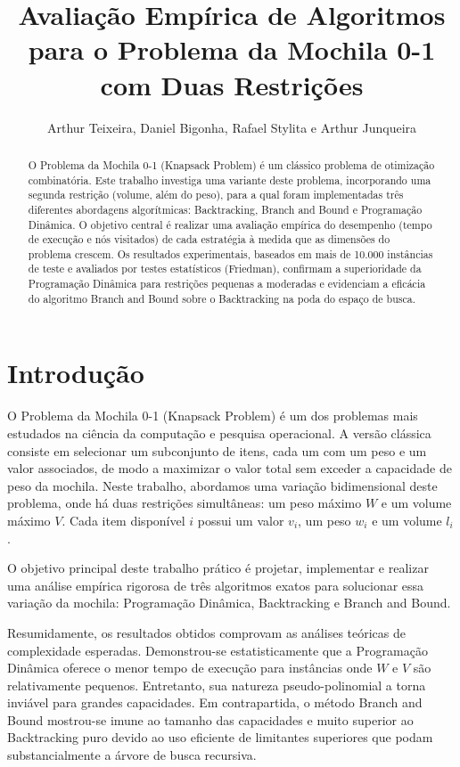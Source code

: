 \documentclass[12pt, a4paper]{article}
\begin{document}
\title{\textbf{Avaliação Empírica de Algoritmos para o Problema da Mochila 0-1 com Duas Restrições}}
\author{Arthur Teixeira, Daniel Bigonha, Rafael Stylita e Arthur Junqueira}
\date{} %

\maketitle

\begin{abstract}
O Problema da Mochila 0-1 (Knapsack Problem) é um clássico problema de otimização combinatória. Este trabalho investiga uma variante deste problema, incorporando uma segunda restrição (volume, além do peso), para a qual foram implementadas três diferentes abordagens algorítmicas: Backtracking, Branch and Bound e Programação Dinâmica. O objetivo central é realizar uma avaliação empírica do desempenho (tempo de execução e nós visitados) de cada estratégia à medida que as dimensões do problema crescem. Os resultados experimentais, baseados em mais de 10.000 instâncias de teste e avaliados por testes estatísticos (Friedman), confirmam a superioridade da Programação Dinâmica para restrições pequenas a moderadas e evidenciam a eficácia do algoritmo Branch and Bound sobre o Backtracking na poda do espaço de busca.
\end{abstract}

\section{Introdução}
O Problema da Mochila 0-1 (Knapsack Problem) é um dos problemas mais estudados na ciência da computação e pesquisa operacional. A versão clássica consiste em selecionar um subconjunto de itens, cada um com um peso e um valor associados, de modo a maximizar o valor total sem exceder a capacidade de peso da mochila. Neste trabalho, abordamos uma variação bidimensional deste problema, onde há duas restrições simultâneas: um peso máximo $W$ e um volume máximo $V$. Cada item disponível $i$ possui um valor $v_i$, um peso $w_i$ e um volume $l_i$.

O objetivo principal deste trabalho prático é projetar, implementar e realizar uma análise empírica rigorosa de três algoritmos exatos para solucionar essa variação da mochila: Programação Dinâmica, Backtracking e Branch and Bound. 

Resumidamente, os resultados obtidos comprovam as análises teóricas de complexidade esperadas. Demonstrou-se estatisticamente que a Programação Dinâmica oferece o menor tempo de execução para instâncias onde $W$ e $V$ são relativamente pequenos. Entretanto, sua natureza pseudo-polinomial a torna inviável para grandes capacidades. Em contrapartida, o método Branch and Bound mostrou-se imune ao tamanho das capacidades e muito superior ao Backtracking puro devido ao uso eficiente de limitantes superiores que podam substancialmente a árvore de busca recursiva.
\end{document}
